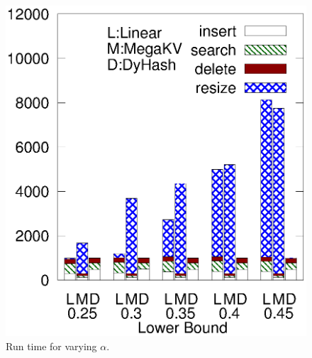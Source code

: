 \begin{figure}[htp]
\begin{minipage}{0.19\linewidth}
		\centerline{\dsali}
	\end{minipage}
	\begin{minipage}{0.19\linewidth}\centering
		\includegraphics[width=\linewidth]{pic/dynamic/random/diff_lower.eps}
		\centerline{\dsrandom}
	\end{minipage}
	\caption{Run time for varying $\alpha$.}
	\label{fig:vary-alpha-time}
\end{figure}
%
